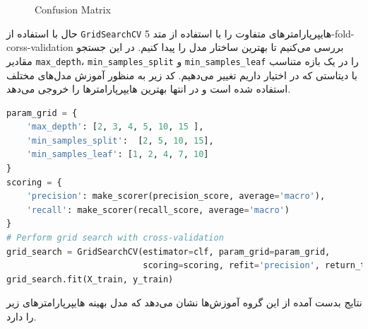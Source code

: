 \documentclass{article}
\begin{document}
\begin{figure}[H] 
	\centering
	\caption{Confusion Matrix}
	\label{fig: Q3 basic cm}
\end{figure}

حال با استفاده از 
\texttt{GridSearchCV}
هایپرپارامتر‌های متفاوت را با استفاده از متد
5-fold-corss-validation
بررسی می‌کنیم تا بهترین ساختار مدل را پیدا کنیم. در این جستجو مقادیر
\texttt{max\_depth}، \texttt{min\_samples\_split} و \texttt{min\_samples\_leaf}
را در یک بازه متناسب با دیتاستی که در اختیار داریم تغییر می‌دهیم. کد زیر به منظور آموزش مدل‌های مختلف استفاده شده است و در انتها بهترین هایپرپارامترها را خروجی می‌دهد.
\begin{LTR}
	\begin{lstlisting}[language=Python, caption=Grid search]
param_grid = {
    'max_depth': [2, 3, 4, 5, 10, 15 ],
    'min_samples_split':  [2, 5, 10, 15],
    'min_samples_leaf': [1, 2, 4, 7, 10]
}
scoring = {
    'precision': make_scorer(precision_score, average='macro'),
    'recall': make_scorer(recall_score, average='macro')
}
# Perform grid search with cross-validation
grid_search = GridSearchCV(estimator=clf, param_grid=param_grid,
                           scoring=scoring, refit='precision', return_train_score=True)
grid_search.fit(X_train, y_train)
	\end{lstlisting}
\end{LTR}

نتایج بدست آمده از این گروه آموزش‌ها نشان می‌دهد که مدل بهینه هایپرپارامتر‌های زیر را دارد.
\end{document}
